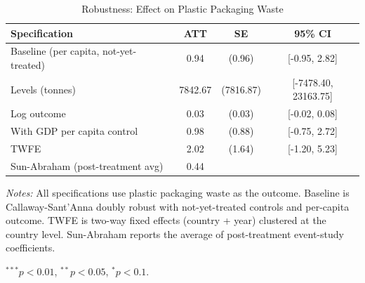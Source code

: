 \begin{table}[t]
\centering
\caption{Robustness: Effect on Plastic Packaging Waste}
\label{tab:robustness}
\begin{tabular}{lccc}
\toprule
  Specification & ATT & SE & 95\% CI \\
\midrule
  Baseline (per capita, not-yet-treated) & 0.94 & (0.96) & [-0.95, 2.82] \\
  Levels (tonnes) & 7842.67 & (7816.87) & [-7478.40, 23163.75] \\
  Log outcome & 0.03 & (0.03) & [-0.02, 0.08] \\
  With GDP per capita control & 0.98 & (0.88) & [-0.75, 2.72] \\
  TWFE & 2.02 & (1.64) & [-1.20, 5.23] \\
  Sun-Abraham (post-treatment avg) & 0.44 & & \\
\bottomrule
\end{tabular}
\begin{tablenotes}[flushleft]
\small
\item \textit{Notes:} All specifications use plastic packaging waste as the outcome. Baseline is Callaway-Sant'Anna doubly robust with not-yet-treated controls and per-capita outcome. TWFE is two-way fixed effects (country + year) clustered at the country level. Sun-Abraham reports the average of post-treatment event-study coefficients.
\item $^{***}p<0.01$, $^{**}p<0.05$, $^{*}p<0.1$.
\end{tablenotes}
\end{table}
